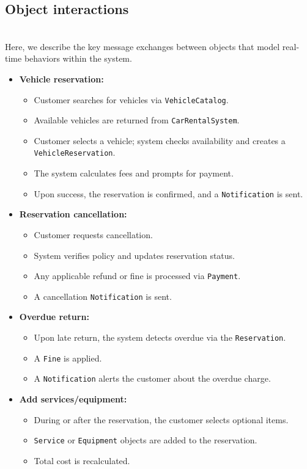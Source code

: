 \subsection{Object interactions}\label{_Aq3DiKyVdfzIFtOXh_JV}
\\
Here, we describe the key message exchanges between objects that model real-time behaviors within the system.

\begin{itemize}
\item
\protect{}\label{w8ORudkoW5jlxWitvcBuJ}
\textbf{Vehicle reservation:}

\begin{itemize}
\item
Customer searches for vehicles via \texttt{VehicleCatalog}.
\item
Available vehicles are returned from \texttt{CarRentalSystem}.
\item
Customer selects a vehicle; system checks availability and creates a \texttt{VehicleReservation}.
\item
The system calculates fees and prompts for payment.
\item
Upon success, the reservation is confirmed, and a \texttt{Notification} is sent.
\end{itemize}
\item
\protect{}\label{A0l1zSNycNmT5B0jo1t1a}
\textbf{Reservation cancellation:}

\begin{itemize}
\item
Customer requests cancellation.
\item
System verifies policy and updates reservation status.
\item
Any applicable refund or fine is processed via \texttt{Payment}.
\item
A cancellation \texttt{Notification} is sent.
\end{itemize}
\item
\protect{}\label{hFdWa_nRz7kSaTW7NBmR6}
\textbf{Overdue return:}

\begin{itemize}
\item
Upon late return, the system detects overdue via the \texttt{Reservation}.
\item
A \texttt{Fine} is applied.
\item
A \texttt{Notification} alerts the customer about the overdue charge.
\end{itemize}
\item
\protect{}\label{91tggfww5lFocytkwnl7f}
\textbf{Add services/equipment:}

\begin{itemize}
\item
During or after the reservation, the customer selects optional items.
\item
\texttt{Service} or \texttt{Equipment} objects are added to the reservation.
\item
Total cost is recalculated.
\end{itemize}
\end{itemize}


